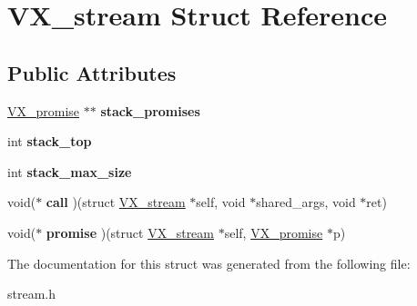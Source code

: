 \hypertarget{structVX__stream}{\section{V\-X\-\_\-stream Struct Reference}
\label{structVX__stream}
}
\subsection*{Public Attributes}
\begin{DoxyCompactItemize}
\item 
\hypertarget{structVX__stream_a6cba079b8ed7c8a662410a54dc6b415c}{\hyperlink{structVX__promise}{V\-X\-\_\-promise} $\ast$$\ast$ {\bfseries stack\-\_\-promises}}\label{structVX__stream_a6cba079b8ed7c8a662410a54dc6b415c}

\item 
\hypertarget{structVX__stream_ad477783c90f5ed360f91b723af922a5c}{int {\bfseries stack\-\_\-top}}\label{structVX__stream_ad477783c90f5ed360f91b723af922a5c}

\item 
\hypertarget{structVX__stream_ab6cae62d1e6a00c2d803bc499d07c2ea}{int {\bfseries stack\-\_\-max\-\_\-size}}\label{structVX__stream_ab6cae62d1e6a00c2d803bc499d07c2ea}

\item 
\hypertarget{structVX__stream_adc56d89ca10684e5c59728154320d38a}{void($\ast$ {\bfseries call} )(struct \hyperlink{structVX__stream}{V\-X\-\_\-stream} $\ast$self, void $\ast$shared\-\_\-args, void $\ast$ret)}\label{structVX__stream_adc56d89ca10684e5c59728154320d38a}

\item 
\hypertarget{structVX__stream_a3a2a07e7f6aa6377a75901d84c5e6291}{void($\ast$ {\bfseries promise} )(struct \hyperlink{structVX__stream}{V\-X\-\_\-stream} $\ast$self, \hyperlink{structVX__promise}{V\-X\-\_\-promise} $\ast$p)}\label{structVX__stream_a3a2a07e7f6aa6377a75901d84c5e6291}

\end{DoxyCompactItemize}


The documentation for this struct was generated from the following file\-:\begin{DoxyCompactItemize}
\item 
stream.\-h\end{DoxyCompactItemize}
